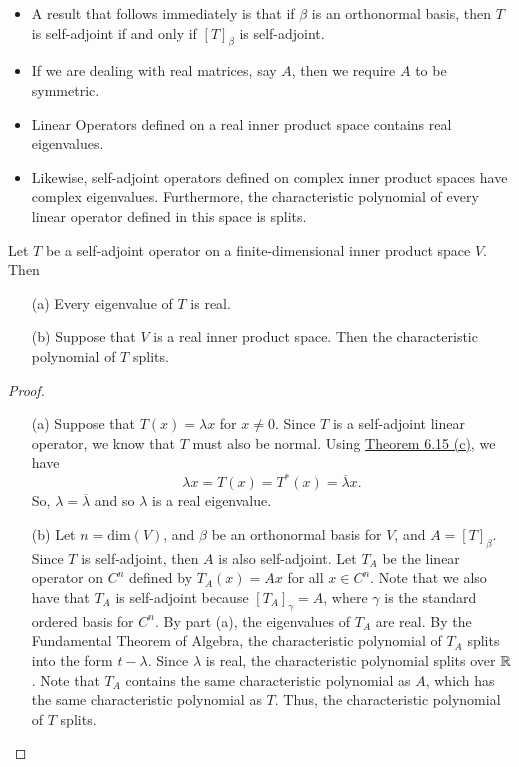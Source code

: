\begin{itemize}
    \item A result that follows immediately is that if \( \beta  \) is an orthonormal basis, then \( T  \) is self-adjoint if and only if \( [T]_{\beta}  \) is self-adjoint.
    \item If we are dealing with real matrices, say \( A  \), then we require \( A  \) to be symmetric.
    \item Linear Operators defined on a real inner product space contains real eigenvalues.
    \item Likewise, self-adjoint operators defined on complex inner product spaces have complex eigenvalues. Furthermore, the characteristic polynomial of every linear operator defined in this space is splits.
\end{itemize}

\begin{lemma}
    Let \( T  \) be a self-adjoint operator on a finite-dimensional inner product space \( V  \). Then
    \begin{enumerate}
        \item[(a)] Every eigenvalue of \( T  \) is real.
        \item[(b)] Suppose that \( V  \) is a real inner product space. Then the characteristic polynomial of \( T  \) splits.
    \end{enumerate}
\end{lemma}

\begin{proof}
\begin{enumerate}
    \item[(a)] Suppose that \( T(x) = \lambda x  \) for \( x \neq 0  \). Since \( T  \) is a self-adjoint linear operator, we know that \( T  \) must also be normal. Using {\hyperref[Theorem 6.15]{Theorem 6.15 (c)}}, we have
        \[  \lambda x = T(x) = T^{*}(x) = \overline{\lambda }x.   \]
        So, \( \lambda = \overline{\lambda} \) and so \( \lambda  \) is a real eigenvalue.
    \item[(b)] Let \( n = \text{dim}(V) \), and \( \beta \) be an orthonormal basis for \( V  \), and \( A = [T]_{\beta} \). Since \( T  \) is self-adjoint, then \( A  \) is also self-adjoint. Let \( {T}_{A} \) be the linear operator on \( C^{n} \) defined by \( {T}_{A}(x) = Ax  \) for all \( x \in C^{n} \). Note that we also have that \( {T}_{A} \) is self-adjoint because \( [{T}_{A}]_{\gamma} = A  \), where \( \gamma  \) is the standard ordered basis for \( C^{n} \). By part (a), the eigenvalues of \( {T}_{A}  \) are real. By the Fundamental Theorem of Algebra, the characteristic polynomial of \( {T}_{A} \) splits into the form \( t - \lambda  \). Since \( \lambda  \) is real, the characteristic polynomial splits over \( \mathbb{R}  \). Note that \( {T}_{A} \) contains the same characteristic polynomial as \( A  \), which has the same characteristic polynomial as \( T  \). Thus, the characteristic polynomial of \( T   \) splits.
\end{enumerate}
\end{proof}

